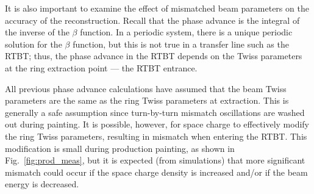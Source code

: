 It is also important to examine the effect of mismatched beam parameters on the accuracy of the reconstruction. Recall that the phase advance is the integral of the inverse of the $\beta$ function. In a periodic system, there is a unique periodic solution for the $\beta$ function, but this is not true in a transfer line such as the RTBT; thus, the phase advance in the RTBT depends on the Twiss parameters at the ring extraction point — the RTBT entrance. 

All previous phase advance calculations have assumed that the beam Twiss parameters are the same as the ring Twiss parameters at extraction. This is generally a safe assumption since turn-by-turn mismatch oscillations are washed out during painting. It is possible, however, for space charge to effectively modify the ring Twiss parameters, resulting in mismatch when entering the RTBT. This modification is small during production painting, as shown in Fig.~\ref{fig:prod_meas}, but it is expected (from simulations) that more significant mismatch could occur if the space charge density is increased and/or if the beam energy is decreased.

